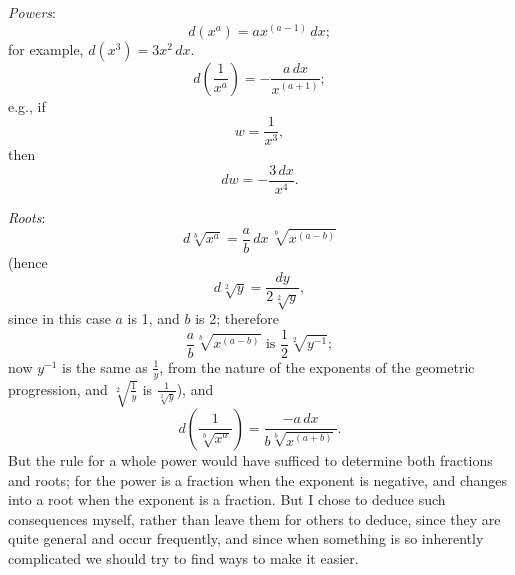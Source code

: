 \documentclass[twoside,openright]{article}
\begin{document}
\vspace*{1ex} {\em Powers}: $$d(x^a) = ax^{(a-1)}\,dx;$$ for example,
$d(x^3) = 3x^2\,dx$.
$$d\left(\frac{1}{x^a}\right) = - \frac{a\,dx}{x^{(a+1)}};$$ e.g., if 
$$w =\frac{1}{x^3},$$ then 
$$dw = -\frac{3\,dx}{x^4}.$$

\vspace*{1ex} {\em Roots}:
$$d\sqrt[b]{x^a} = \frac{a}{b}\,dx\,\sqrt[b]{x^{(a-b)}}$$ (hence
$$d\sqrt[2]{y} = \frac{dy}{2\sqrt[2]{y}},$$ since in this case $a$ is 1, and
$b$ is 2; therefore
$$ \frac{a}{b}\sqrt[b]{x^{(a-b)}} \mbox{ is } \frac{1}{2}\sqrt[2]{y^{-1}};$$ now
$y^{-1}$ is the same as $\frac{1}{y}$, from the nature of the
exponents of the geometric progression, and $\sqrt[2]{\frac{1}{y}}$ is
$\frac{1}{\sqrt[2]{y}}$), and
$$d\left(\frac{1}{\sqrt[b]{x^a}}\right) = \frac{-a\,dx}{b\sqrt[b]{x^{(a+b)}}}.$$ But the rule
for a whole power would have sufficed to determine both fractions and
roots; for the power is a fraction when the exponent is negative, and
changes into a root when the exponent is a fraction. But I chose to deduce such consequences myself,
rather than leave them for others to deduce, since they are quite
general and occur frequently, and since when something is so
inherently complicated we should try to find ways to make it
easier.
\end{document}
